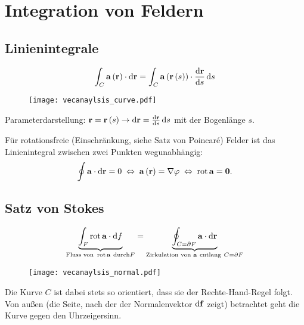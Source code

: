 \section{Integration von Feldern}


\subsection{Linienintegrale}


\begin{equation*}
	\int _{C}\mathbf{a}\left(\mathbf{r}\right)\cdot \mathop{}\!\mathrm{d} \mathbf{r}=\int _{C}\mathbf{a}\left(\mathbf{r}\left(s\right)\right)\cdot \frac{\mathop{}\!\mathrm{d} \mathbf{r}}{\mathop{}\!\mathrm{d} s}\mathop{}\!\mathrm{d} s
\end{equation*}


\begin{figure}[htb]
	\centering
	\texttt{[image: vecanaylsis\_curve.pdf]}
	\caption{}
	\label{fig:vecanaylsis_curve}
\end{figure}

Parameterdarstellung: $\mathbf{r}=\mathbf{r}\left(s\right)\rightarrow \mathop{}\!\mathrm{d} \mathbf{r}=\frac{\mathop{}\!\mathrm{d} \mathbf{r}}{\mathop{}\!\mathrm{d} s}\mathop{}\!\mathrm{d} s$ mit der Bogenlänge $s$.

Für rotationsfreie (Einschränkung, siehe Satz von Poincaré) Felder ist das Linienintegral zwischen zwei Punkten wegunabhängig:
\begin{equation*}
	\oint \mathbf{a}\cdot \mathop{}\!\mathrm{d} \mathbf{r}=0\;\Leftrightarrow\; \mathbf{a}\left(\mathbf{r}\right)=\nabla \varphi \;\Leftrightarrow\; \operatorname{rot} \mathbf{a}=\mathbf{0}.
\end{equation*}


\subsection{Satz von Stokes}

\begin{equation*}
	\underset{\text{Fluss von }\operatorname{rot} \mathbf{a}~\text{durch} F}{\underbrace{ \int _{F}\operatorname{rot} \mathbf{a}\cdot \mathop{}\!\mathrm{d} f}}=\underset{\text{Zirkulation von }\mathbf{a}~\text{entlang}~ C=\partial F}{\underbrace{\oint _{C=\partial F}\mathbf{a}\cdot \mathop{}\!\mathrm{d} \mathbf{r}}}
\end{equation*}

\begin{figure}[htb]
	\centering
	\texttt{[image: vecanaylsis\_normal.pdf]}
	\caption{}
	\label{fig:vecanaylsis_normal}
\end{figure}

Die Kurve $C$ ist dabei stets so orientiert, dass sie der Rechte-Hand-Regel folgt. Von außen (die Seite, nach der der Normalenvektor $\mathop{}\!\mathrm{d} \mathbf{f}$ zeigt) betrachtet geht die Kurve gegen den Uhrzeigersinn.


